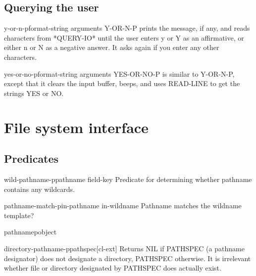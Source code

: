 \documentclass[10pt,english]{book}
\begin{document}
\section{Querying the user}
\label{sec:querying-user}

\begin{function}{y-or-n-p}{\op format-string \rest arguments}
  Y-OR-N-P prints the message, if any, and reads characters from
   *QUERY-IO* until the user enters y or Y as an affirmative, or either
   n or N as a negative answer. It asks again if you enter any other
   characters.
\end{function}

\begin{function}{yes-or-no-p}{\op format-string \rest arguments}
  YES-OR-NO-P is similar to Y-OR-N-P, except that it clears the
   input buffer, beeps, and uses READ-LINE to get the strings
   YES or NO.
\end{function}


\chapter{File system interface}
\label{cha:file-syst-interf}

\section{Predicates}
\label{sec:predicates-3}

\begin{function}{wild-pathname-p}{pathname \op field-key}
  Predicate for determining whether pathname contains any wildcards.
\end{function}

\begin{function}{pathname-match-p}{in-pathname in-wildname}
  Pathname matches the wildname template?
\end{function}

\begin{function}{pathnamep}{object}
  
\end{function}

\begin{function}{directory-pathname-p}{pathspec}[cl-ext]
  Returns NIL if PATHSPEC (a pathname designator) does not designate a
  directory, PATHSPEC otherwise. It is irrelevant whether file or
  directory designated by PATHSPEC does actually exist.
\end{function}
\end{document}
